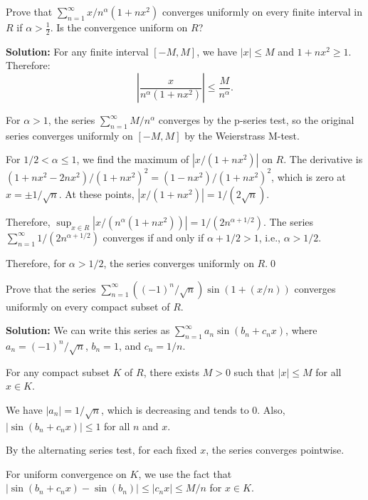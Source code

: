 \begin{problembox}
Prove that \(\sum_{n=1}^{\infty} x/n^\alpha (1 + nx^2)\) converges uniformly on every finite interval in \( R \) if \( \alpha > \frac{1}{2} \). Is the convergence uniform on \( R \)?
\end{problembox}

\noindent\textbf{Solution:} For any finite interval \([-M, M]\), we have \( |x| \leq M \) and \( 1 + nx^2 \geq 1 \). Therefore:
\[\left|\frac{x}{n^\alpha (1 + nx^2)}\right| \leq \frac{M}{n^\alpha}.\]

For \( \alpha > 1 \), the series \( \sum_{n=1}^{\infty} M/n^\alpha \) converges by the p-series test, so the original series converges uniformly on \([-M, M]\) by the Weierstrass M-test.

For \( 1/2 < \alpha \leq 1 \), we find the maximum of \( |x/(1 + nx^2)| \) on \( R \). The derivative is \( (1 + nx^2 - 2nx^2)/(1 + nx^2)^2 = (1 - nx^2)/(1 + nx^2)^2 \), which is zero at \( x = \pm 1/\sqrt{n} \). At these points, \( |x/(1 + nx^2)| = 1/(2\sqrt{n}) \).

Therefore, \( \sup_{x \in R} |x/(n^\alpha (1 + nx^2))| = 1/(2n^{\alpha + 1/2}) \). The series \( \sum_{n=1}^{\infty} 1/(2n^{\alpha + 1/2}) \) converges if and only if \( \alpha + 1/2 > 1 \), i.e., \( \alpha > 1/2 \).

Therefore, for \( \alpha > 1/2 \), the series converges uniformly on \( R \).\qed


\begin{problembox}
Prove that the series \(\sum_{n=1}^{\infty} ((-1)^n/\sqrt{n}) \sin (1 + (x/n))\) converges uniformly on every compact subset of \( R \).
\end{problembox}

\noindent\textbf{Solution:} We can write this series as \( \sum_{n=1}^{\infty} a_n \sin(b_n + c_n x) \), where \( a_n = (-1)^n/\sqrt{n} \), \( b_n = 1 \), and \( c_n = 1/n \).

For any compact subset \( K \) of \( R \), there exists \( M > 0 \) such that \( |x| \leq M \) for all \( x \in K \).

We have \( |a_n| = 1/\sqrt{n} \), which is decreasing and tends to 0. Also, \( |\sin(b_n + c_n x)| \leq 1 \) for all \( n \) and \( x \).

By the alternating series test, for each fixed \( x \), the series converges pointwise.

For uniform convergence on \( K \), we use the fact that \( |\sin(b_n + c_n x) - \sin(b_n)| \leq |c_n x| \leq M/n \) for \( x \in K \).

